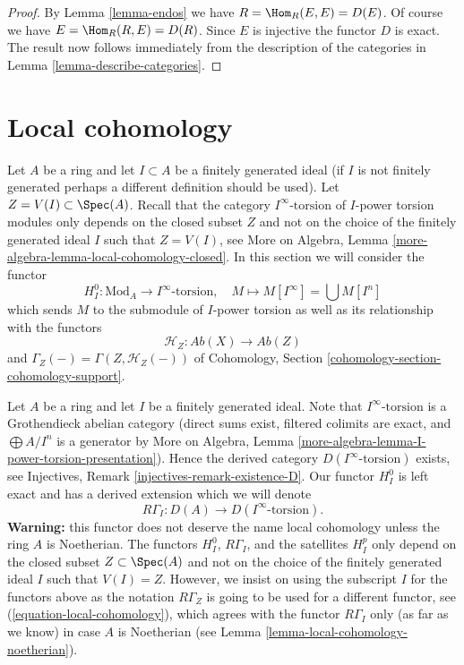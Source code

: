 \begin{proof}
By Lemma \ref{lemma-endos} we have $R = \Hom_R(E, E) = D(E)$.
Of course we have $E = \Hom_R(R, E) = D(R)$. Since $E$ is injective
the functor $D$ is exact. The result now follows immediately from the
description of the categories in
Lemma \ref{lemma-describe-categories}.
\end{proof}




















\section{Local cohomology}
\label{section-local-cohomology}

\noindent
Let $A$ be a ring and let $I \subset A$ be a finitely generated ideal
(if $I$ is not finitely generated perhaps a different definition
should be used). Let $Z = V(I) \subset \Spec(A)$. Recall that the
category $I^\infty\text{-torsion}$ of $I$-power torsion modules
only depends on the closed subset $Z$ and not on the choice of the
finitely generated ideal $I$ such that $Z = V(I)$, see
More on Algebra, Lemma \ref{more-algebra-lemma-local-cohomology-closed}.
In this section we will consider the functor
$$
H^0_{I} : \text{Mod}_A \longrightarrow I^\infty\text{-torsion},\quad
M \longmapsto M[I^\infty] = \bigcup M[I^n]
$$
which sends $M$ to the submodule of $I$-power torsion as well as its
relationship with the functors
$$
\mathcal{H}_Z :
\textit{Ab}(X)
\longrightarrow
\textit{Ab}(Z)
$$
and $\Gamma_Z( - ) = \Gamma(Z, \mathcal{H}_Z(-))$ of
Cohomology, Section \ref{cohomology-section-cohomology-support}.

\medskip\noindent
Let $A$ be a ring and let $I$ be a finitely generated ideal.
Note that $I^\infty\text{-torsion}$ is a Grothendieck
abelian category (direct sums exist, filtered colimits are
exact, and $\bigoplus A/I^n$ is a generator by
More on Algebra, Lemma \ref{more-algebra-lemma-I-power-torsion-presentation}).
Hence the derived category $D(I^\infty\text{-torsion})$ exists, see
Injectives, Remark \ref{injectives-remark-existence-D}.
Our functor $H^0_I$ is left exact and has a derived extension
which we will denote
$$
R\Gamma_I : D(A) \longrightarrow D(I^\infty\text{-torsion}).
$$
{\bf Warning:} this functor does not deserve the name
local cohomology unless the ring $A$ is Noetherian.
The functors $H^0_I$, $R\Gamma_I$, and the satellites $H^p_I$
only depend on the closed subset $Z \subset \Spec(A)$ and not
on the choice of the finitely generated ideal $I$ such that
$V(I) = Z$. However, we insist on using the subscript $I$ for
the functors above as the notation $R\Gamma_Z$ is going
to be used for a different functor, see
(\ref{equation-local-cohomology}), which
agrees with the functor $R\Gamma_I$ only (as far as we know)
in case $A$ is Noetherian
(see Lemma \ref{lemma-local-cohomology-noetherian}).

